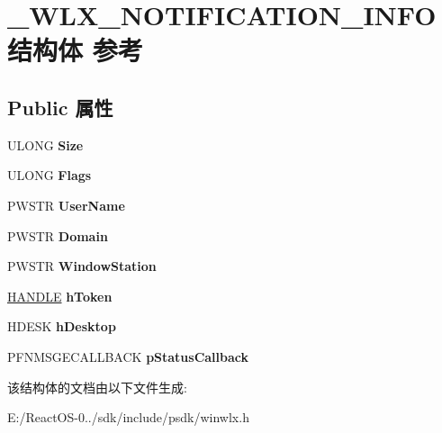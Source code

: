 \hypertarget{struct___w_l_x___n_o_t_i_f_i_c_a_t_i_o_n___i_n_f_o}{}\section{\+\_\+\+W\+L\+X\+\_\+\+N\+O\+T\+I\+F\+I\+C\+A\+T\+I\+O\+N\+\_\+\+I\+N\+F\+O结构体 参考}
\label{struct___w_l_x___n_o_t_i_f_i_c_a_t_i_o_n___i_n_f_o}
\subsection*{Public 属性}
\begin{DoxyCompactItemize}
\item 
\mbox{\label{struct___w_l_x___n_o_t_i_f_i_c_a_t_i_o_n___i_n_f_o_a1cd30f80fa96f5a88d7d45cc625a98e6}} 
U\+L\+O\+NG {\bfseries Size}
\item 
\mbox{\label{struct___w_l_x___n_o_t_i_f_i_c_a_t_i_o_n___i_n_f_o_a6160067ef76dd1ff05eb4c64a0c819c0}} 
U\+L\+O\+NG {\bfseries Flags}
\item 
\mbox{\label{struct___w_l_x___n_o_t_i_f_i_c_a_t_i_o_n___i_n_f_o_a27b49ba4e3d88a5c26a133cc07adfe29}} 
P\+W\+S\+TR {\bfseries User\+Name}
\item 
\mbox{\label{struct___w_l_x___n_o_t_i_f_i_c_a_t_i_o_n___i_n_f_o_afb180a5917aec06ba6d08ee853dcdffe}} 
P\+W\+S\+TR {\bfseries Domain}
\item 
\mbox{\label{struct___w_l_x___n_o_t_i_f_i_c_a_t_i_o_n___i_n_f_o_af9f027ae0326101c9bd09156ddf9579a}} 
P\+W\+S\+TR {\bfseries Window\+Station}
\item 
\mbox{\label{struct___w_l_x___n_o_t_i_f_i_c_a_t_i_o_n___i_n_f_o_ab46cba68c4a6702cfac8a08ae22fced4}} 
\hyperlink{interfacevoid}{H\+A\+N\+D\+LE} {\bfseries h\+Token}
\item 
\mbox{\label{struct___w_l_x___n_o_t_i_f_i_c_a_t_i_o_n___i_n_f_o_ad0314a2452c0f4e402a7616ab142890a}} 
H\+D\+E\+SK {\bfseries h\+Desktop}
\item 
\mbox{\label{struct___w_l_x___n_o_t_i_f_i_c_a_t_i_o_n___i_n_f_o_ae43114a4cef4dc1517dda136634060e1}} 
P\+F\+N\+M\+S\+G\+E\+C\+A\+L\+L\+B\+A\+CK {\bfseries p\+Status\+Callback}
\end{DoxyCompactItemize}


该结构体的文档由以下文件生成\+:\begin{DoxyCompactItemize}
\item 
E\+:/\+React\+O\+S-\/0../sdk/include/psdk/winwlx.\+h\end{DoxyCompactItemize}
